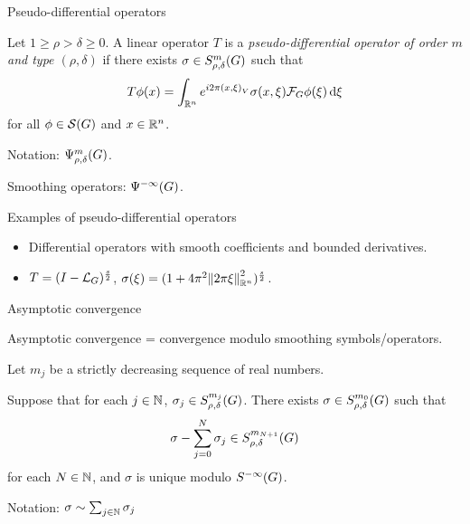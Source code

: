 \documentclass{beamer}
\begin{document}
\begin{frame}
    {Pseudo-differential operators}

    \begin{definition}

        Let $1 \geq \rho > \delta \geq 0$.
        A linear operator $T$ is a \emph{pseudo-differential operator of order $m$ and type $(\rho, \delta)$}
        if there exists $\sigma \in \SymbolClass m {\rho, \delta}$ such that
        \begin{align*}
            T \phi(x)
            = \int_{\R^n} \e^{\i \turn \ip x \xi} \sigma(x, \xi) \Fourier \phi(\xi) \dd \xi
        \end{align*}
        for all $\phi \in \Schwartz \Group$ and $x \in \R^n$.

        \pause
        Notation: $\OperatorClass m {\rho, \delta}$.
    \end{definition}
    \pause
    Smoothing operators: $\SmoothingOperators$.
\end{frame}

\begin{frame}
    {Examples of pseudo-differential operators}

    \begin{itemize}
        \item Differential operators with smooth coefficients and bounded derivatives.
        \item $T = \BesselPotential s$, $\sigma(\xi) = (1 + 4 \pi^2 \norm [\R^n] {\turn \xi}^2)^{\frac s 2}$.
    \end{itemize}
\end{frame}

\begin{frame}
    {Asymptotic convergence}

    Asymptotic convergence = convergence modulo smoothing symbols/operators.
    \pause
    \begin{theorem}
        Let $m_j$ be a strictly decreasing sequence of real numbers.

        Suppose that for each $j \in \N$, $\sigma_j \in \SymbolClass {m_j} {\rho, \delta}$.
        There exists $\sigma \in \SymbolClass {m_0} {\rho, \delta}$ such that \begin{align*}
            \sigma - \sum_{j = 0}^{N} \sigma_j \in \SymbolClass {m_{N + 1}} {\rho, \delta}
        \end{align*}
        for each $N \in \N$,
        and $\sigma$ is unique modulo $\SmoothingSymbols$.
    \end{theorem}

    \pause
    Notation: $\sigma \sim \sum_{j \in \N} \sigma_j$
\end{frame}
\end{document}
